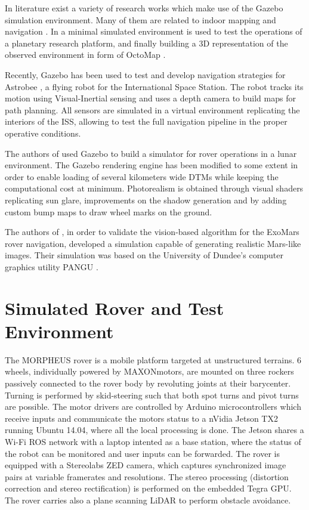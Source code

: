 \documentclass[conference]{IEEEtran}  %
\begin{document}
In literature exist a variety of research works which make use of the Gazebo simulation environment. Many of them are related to indoor mapping and navigation \cite{10.1007/978-3-319-25903-1_24,wang2017autonomous,rivera2019unmanned}. In \cite{jayasekara2012testing} a minimal simulated environment is used to test the operations of a planetary research platform, and finally building a 3D representation of the observed environment in form of OctoMap \cite{hornung13auro}.

Recently, Gazebo has been used to test and develop navigation strategies for Astrobee \cite{fluckiger2019astrobee,vargas2018astrobee}, a flying robot for the International Space Station. The robot tracks its motion using Visual-Inertial sensing and uses a depth camera to build maps for path planning. All sensors are simulated in a virtual environment replicating the interiors of the ISS, allowing to test the full navigation pipeline in the proper operative conditions.

The authors of \cite{allan2019planetary} used Gazebo to build a simulator for rover operations in a lunar environment. The Gazebo rendering engine has been modified to some extent in order to enable loading of several kilometers wide DTMs while keeping the computational cost at minimum. Photorealism is obtained through visual shaders replicating sun glare, improvements on the shadow generation and by adding custom bump maps to draw wheel marks on the ground.

The authors of \cite{mccrum2010mars}, in order to validate the vision-based algorithm for the ExoMars rover navigation, developed a simulation capable of generating realistic Mars-like images. Their simulation was based on the University   of   Dundee's computer graphics utility PANGU \cite{parkes2009testing}.

\section{Simulated Rover and Test Environment}\label{sec::sim}
The MORPHEUS rover is a mobile platform targeted at unstructured terrains. 6 wheels, individually powered by MAXON\textsuperscript\textregistered motors, are mounted on three rockers passively connected to the rover body by revoluting joints at their barycenter. Turning is performed by skid-steering such that both spot turns and pivot turns are possible. The motor drivers are controlled by Arduino microcontrollers which receive inputs and communicate the motors status to a nVidia Jetson TX2 running Ubuntu 14.04, where all the local processing is done. The Jetson shares a Wi-Fi ROS network with a laptop intented as a base station, where the status of the robot can be monitored and user inputs can be forwarded. The rover is equipped with a Stereolabs ZED camera, which captures synchronized image pairs at variable framerates and resolutions. The stereo processing (distortion correction and stereo rectification) is performed on the embedded Tegra GPU. The rover carries also a plane scanning LiDAR to perform obstacle avoidance.
\end{document}
